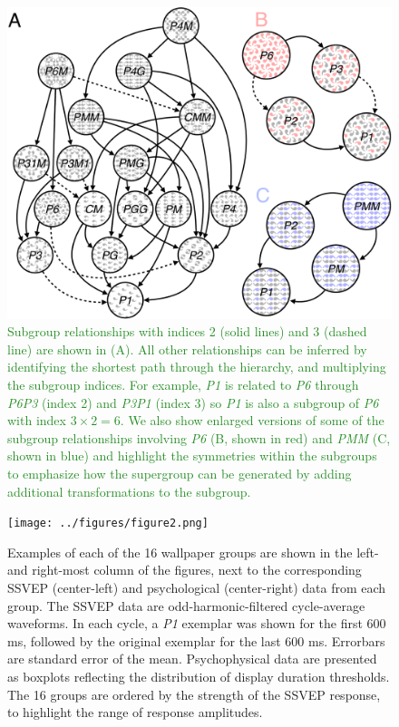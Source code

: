 \documentclass[11pt, twoside]{article}
\begin{document}
\begin{figure}[hptb]
\centering
\includegraphics[width=0.75\linewidth]{../figures/figure1.pdf}
\caption{\textcolor{ForestGreen}{Subgroup relationships with indices 2 (solid lines) and 3 (dashed line) are shown in (A). All other relationships can be inferred by identifying the shortest path through the hierarchy, and multiplying the subgroup indices. For example, \textit{P1} is related to \textit{P6} through \textit{P6}\textrightarrow\textit{P3} (index 2) and \textit{P3}\textrightarrow\textit{P1} (index 3) so \textit{P1} is also a subgroup of \textit{P6} with index $3 \times 2 = 6$. We also show enlarged versions of some of the subgroup relationships involving \textit{P6} (B, shown in red) and \textit{PMM} (C, shown in blue) and highlight the symmetries within the subgroups to emphasize how the supergroup can be generated by adding additional transformations to the subgroup.}}
\label{fig:subgroups}
\end{figure}

\begin{figure}[hp]
\centering
\texttt{[image: ../figures/figure2.png]}
\caption{Examples of each of the 16 wallpaper groups are shown in the left- and right-most column of the figures, next to the corresponding SSVEP (center-left) and psychological (center-right) data from each group. The SSVEP data are odd-harmonic-filtered cycle-average waveforms. In each cycle, a \textit{P1} exemplar was shown for the first 600 ms, followed by the original exemplar for the last 600 ms. Errorbars are standard error of the mean. Psychophysical data are presented as boxplots reflecting the distribution of display duration thresholds. The 16 groups are ordered by the strength of the SSVEP response, to highlight the range of response amplitudes.}
\label{fig:summary}
\end{figure}
\end{document}
